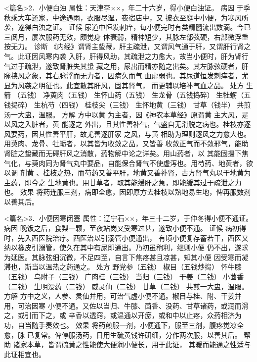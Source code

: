 \documentclass[a4paper,12pt,UTF8,twoside]{ctexbook}
\begin{document}
<篇名>2．小便白浊
属性：天津李××，年二十六岁，得小便白浊证。 
病因 于季秋乘大车还家，中途遇雨，衣服尽湿，夜宿店中，又 
披衣至庭中小便，为寒风所袭，遂得白浊之证。 
证候 尿道中恒发刺痒，每小便完时有类精髓流出数滴。今已三阅月，屡次服药无效，颇觉身 
体衰弱，精神短少，其脉左部弦硬，右部微浮重按无力。 
诊断 《内经》谓肾主蛰藏，肝主疏泄，又谓风气通于肝，又谓肝行肾之气。此证因风寒内袭 
入肝，肝得风助，其疏泄之力愈大，故当小便时，肝为肾行气过于疏泄，遂致肾脏失其蛰 
藏之用，尿出而精亦随之出矣。其左脉弦硬者，肝脉挟风之象，其右脉浮而无力者，因病久而气 
血虚弱也。其尿道恒发刺痒者，尤显为风袭之明征也。此宜散其肝风，固其肾气， 
而更辅以培补气血之品。 
处方 生箭 （五钱） 净萸肉（五钱） 生怀山药（五钱） 生龙骨（五钱捣碎） 
生牡蛎（五钱捣碎） 生杭芍（四钱） 桂枝尖（三钱） 生怀地黄（三钱） 甘草（钱半） 
共煎汤一大盅，温服。 
方解 方中以黄 为主者，因《神农本草经》原谓黄 主大风，是以风之入脏者，黄 能逐之 
外出，且其性善补气，气盛自无滑脱之病也。桂枝亦逐风要药，因其性善平肝，故尤善逐肝家 
之风，与黄 相助为理则逐风之力愈大也。用萸肉、龙骨、牡蛎者，以其皆为收敛之品，又皆善 
收敛正气而不敛邪气，能助肾脏之蛰藏而无碍肝风之消散，药物解中论之详矣。用山药者，以 
其能固摄下焦气化，与萸肉同为肾气丸中要品，自能保合肾气不使虚泻也。用芍药、地黄者，欲以调 
剂黄 、桂枝之热，而芍药又善平肝，地黄又善补肾，古方肾气丸以干地黄为主药，即今之 
生地黄也。用甘草者，取其能缓肝之急，即能缓其过于疏泄之力也。 
效果 将药连服三剂，病即全愈，因即原方去桂枝以熟地易生地，俾再服数剂以善其后。 


<篇名>3．小便因寒闭塞
属性：辽宁石××，年三十二岁，于仲冬得小便不通证。 
病因 晚饭之后，食梨一颗，至夜站岗又受寒过甚，遂致小便不通。 
证候 病初得时，先入西医院治疗。西医治以引溺管小便通出， 
有顷小便复存蓄若干，西医又纳以橡皮引溺管，使久在其中有尿即通出。乃初虽稍利，继则小便 
仍不出，遂求为延医。其脉弦细沉微，不足四至，自言下焦疼甚且凉甚，知其小便 
因受寒而凝滞也，斯当以温热之药通之。 
处方 野党参（五钱） 椒目（五钱炒捣） 怀牛膝（五钱） 乌附子（三钱） 
广肉桂（三钱） 当归（三钱） 干姜（二钱） 小茴香（二钱） 
生明没药（二钱） 威灵仙（二钱） 甘草（二钱） 
共煎一大盅，温服。 
方解 方中之义，人参、灵仙并用，可治气虚小便不通。椒目与桂、附、干姜并用，可治因寒 
小便不通。又佐以当归、牛膝、茴香、没药、甘草诸药，或润而滑之，或引而下之，或 
辛香以透窍，或温通以开瘀，或和中以止疼，众药相济为功，自当随手奏效也。 
效果 将药煎服一剂，小便通下，服至三剂，腹疼觉凉全愈，脉 
已复常。俾停服汤药，日用生硫黄钱许研细，分作两次服，以善其后。 
帮助 诸家本草，皆谓硫黄之性能使大便润小便长，用于此证， 
其暖而能通之性适与此证相宜也。 
\end{document}
